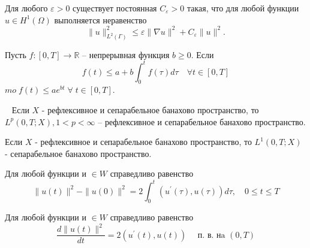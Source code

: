 \begin{lemma}
    \label{lm:1_7:23}\cite[41]{grisvard1985elliptic}
    Для любого $\varepsilon>0$ существует постоянная $C_{\varepsilon}>0$ такая,
    что для любой функции $u \in H^{1}(\Omega)$ выполняется неравенство
    \[
        \|u\|_{L^{2}(\Gamma)}^{2} \leq \varepsilon\|\nabla u\|^{2}
        +C_{\varepsilon}\|u\|^{2}.
    \]
\end{lemma}

\begin{lemma}[Гронуолл]
    \label{lm:1_7:24}\cite[191]{Gaevskii1978}
    Пусть $f:[0, T] \rightarrow \mathbb{R}$ -- непрерывная функция $b \geq 0$.
    Если
    \[ f(t) \leq a+b \int_{0}^{t} f(\tau) d \tau \quad \forall t \in[0, T] \]
    $mo \; f(t) \leq a e^{bt} \; \forall \; t \in[0, T]$.
\end{lemma}

\begin{lemma}
    \label{lm:1_7:28}~\cite[411]{Zeidler1990a}
    Если $X$ - рефлексивное и сепарабельное банахово пространство,
    то $L^{p}(0, T ; X), 1<p<\infty$ -- рефлексивное
    и сепарабельное банахово пространство.
\end{lemma}

\begin{lemma}
    \label{lm:1_7:29}\cite[449]{Zeidler1990a}
    Если $X$ - рефлексивное и сепарабельное банахово пространство,
    то $L^{1}(0, T ; X)$ - сепарабельное банахово пространство.
\end{lemma}

\begin{lemma}
    \label{lm:1_7:31}\cite[423]{Zeidler1990a}
    Для любой функции и $\in W$ справедливо равенство
    \[
        \|u(t)\|^{2}-\|u(0)\|^{2}=2 \int_{0}^{t}\left(u^{\prime}(\tau),
        u(\tau)\right) d \tau, \quad 0 \leq t \leq T
    \]
\end{lemma}

\begin{lemma}
    \label{lm:1_7:32}\cite[356]{Kolmogorov2004}
    Для любой функции и $\in W$ справедливо равенство
    \[
        \frac{d\|u(t)\|^{2}}{d t}=2\left(u^{\prime}(t),
        u(t)\right) \quad \text { п.\ в.\ нa }(0, T)
    \]
\end{lemma}
